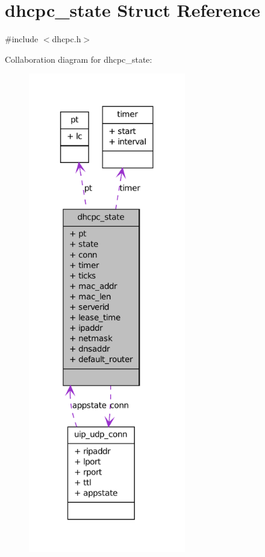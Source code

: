 \hypertarget{structdhcpc__state}{
\section{dhcpc\_\-state Struct Reference}
\label{structdhcpc__state}
}


{\ttfamily \#include $<$dhcpc.h$>$}



Collaboration diagram for dhcpc\_\-state:
\nopagebreak
\begin{figure}[H]
\begin{center}
\leavevmode
\includegraphics[width=194pt]{structdhcpc__state__coll__graph}
\end{center}
\end{figure}
